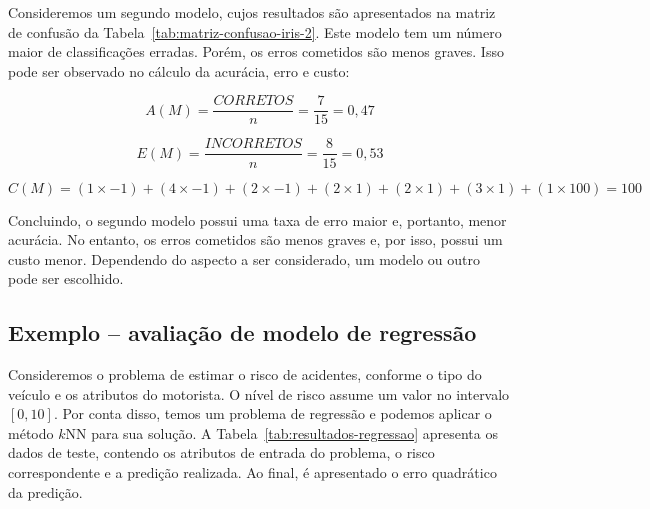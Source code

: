 Consideremos um segundo modelo, cujos resultados são apresentados na matriz de confusão da Tabela~\ref{tab:matriz-confusao-iris-2}. Este modelo tem um número maior de classificações erradas. Porém, os erros cometidos são menos graves. Isso pode ser observado no cálculo da acurácia, erro e custo:

$$
A(M) = \frac{CORRETOS}{n} = \frac{7}{15} = 0,47
$$

$$
E(M) = \frac{INCORRETOS}{n} = \frac{8}{15} = 0,53
$$

$$
C(M) = (1 \times -1) + (4 \times -1) + (2 \times -1) + (2 \times 1) + (2 \times 1) + (3 \times 1) + (1 \times 100) = 100
$$

Concluindo, o segundo modelo possui uma taxa de erro maior e, portanto, menor acurácia. No entanto, os erros cometidos são menos graves e, por isso, possui um custo menor. Dependendo do aspecto a ser considerado, um modelo ou outro pode ser escolhido.

\subsection{Exemplo -- avaliação de modelo de regressão}

Consideremos o problema de estimar o risco de acidentes, conforme o tipo do veículo e os atributos do motorista. O nível de risco assume um valor no intervalo $[0, 10]$. Por conta disso, temos um problema de regressão e podemos aplicar o método $k$NN para sua solução. A Tabela~\ref{tab:resultados-regressao} apresenta os dados de teste, contendo os atributos de entrada do problema, o risco correspondente e a predição realizada. Ao final, é apresentado o erro quadrático da predição.

